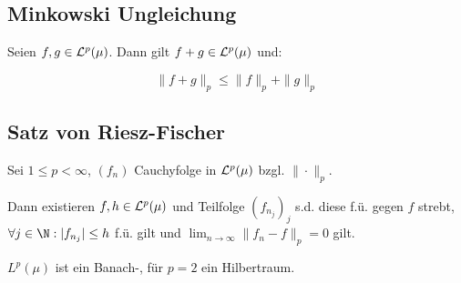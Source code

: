 \subsection*{Minkowski Ungleichung}

Seien $f, g \in \mathcal{L}^p(\mu)$. Dann gilt $f + g \in \mathcal{L}^p(\mu)$ und:

\vspace{-2mm}
$$\| f + g \|_p \leq \|f\|_p + \|g\|_p$$

\subsection*{Satz von Riesz-Fischer}

Sei $1 \leq p < \infty$, $(f_n)$ Cauchyfolge in $\mathcal{L}^p(\mu)$ bzgl. $\|\cdot\|_p$.

Dann existieren $f, h \in \mathcal{L}^p(\mu)$ und Teilfolge $(f_{n_j})_j$ s.d. diese f.ü. gegen $f$ strebt, $\forall j \in \N : |f_{n_j}| \leq h$ f.ü. gilt und $\displaystyle\lim_{n \to \infty} \|f_n - f\|_p = 0$ gilt.

$L^p(\mu)$ ist ein Banach-, für $p=2$ ein Hilbertraum.
